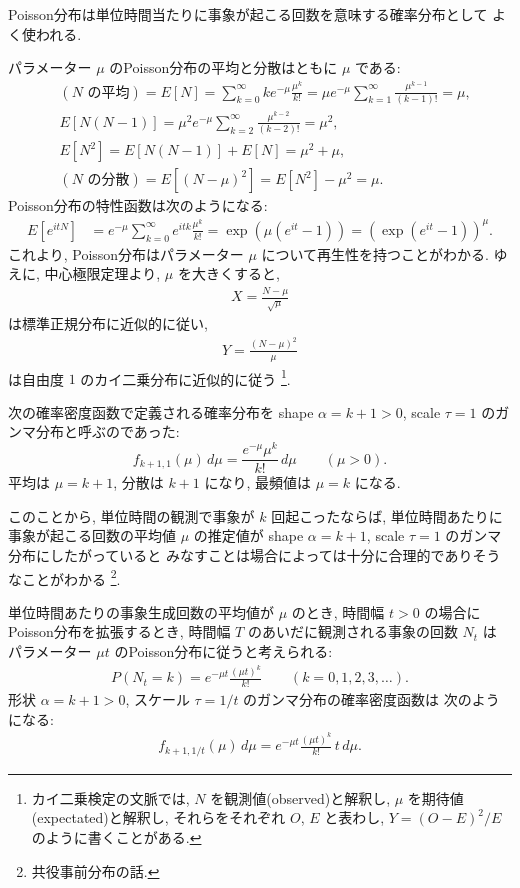 \documentclass[12pt,twoside]{jarticle}
\theoremstyle{jplain}
\theoremstyle{jplain}
\theoremstyle{jplain}
\numberwithin{theorem}{section}
\numberwithin{equation}{section}
\numberwithin{figure}{section}
\numberwithin{table}{section}
\begin{document}
Poisson分布は単位時間当たりに事象が起こる回数を意味する確率分布として
よく使われる.

パラメーター $\mu$ のPoisson分布の平均と分散はともに $\mu$ である:
\begin{align*}
&
(\text{$N$ の平均})
=E[N] 
= \sum_{k=0}^\infty k e^{-\mu}\frac{\mu^k}{k!}
= \mu e^{-\mu} \sum_{k=1}^\infty \frac{\mu^{k-1}}{(k-1)!}
= \mu,
\\ &
E[N(N-1)]
= \mu^2 e^{-\mu} \sum_{k=2}^\infty \frac{\mu^{k-2}}{(k-2)!}
= \mu^2,
\\ &
E[N^2] = E[N(N-1)]+E[N]=\mu^2+\mu,
\\ &
(\text{$N$ の分散})=E[(N-\mu)^2] = E[N^2]-\mu^2 = \mu.
\end{align*}
Poisson分布の特性函数は次のようになる:
\begin{align*}
E[e^{itN}] 
&= e^{-\mu} \sum_{k=0}^\infty e^{itk} \frac{\mu^k}{k!}
= \exp(\mu(e^{it}-1))
= \left(\exp(e^{it}-1)\right)^\mu.
\end{align*}
これより, Poisson分布はパラメーター $\mu$ について再生性を持つことがわかる.
ゆえに, 中心極限定理より, $\mu$ を大きくすると, 
\begin{align*}
X = \frac{N-\mu}{\sqrt{\mu}}
\end{align*}
は標準正規分布に近似的に従い, 
\begin{align*}
Y = \frac{(N-\mu)^2}{\mu}
\end{align*} 
は自由度 $1$ のカイ二乗分布に近似的に従う%
\footnote{%
カイ二乗検定の文脈では, 
$N$ を観測値(observed)と解釈し, 
$\mu$ を期待値(expectated)と解釈し, 
それらをそれぞれ $O$, $E$ と表わし, $Y=(O-E)^2/E$
のように書くことがある.}.

次の確率密度函数で定義される確率分布を
shape $\alpha=k+1>0$, scale $\tau=1$ のガンマ分布と呼ぶのであった:
\[
f_{k+1,1}(\mu)\,d\mu
=\frac{e^{-\mu}\mu^k}{k!}\,d\mu
\qquad (\mu>0).
\]
平均は $\mu=k+1$, 分散は $k+1$ になり,  
最頻値は $\mu=k$ になる.

このことから, 単位時間の観測で事象が $k$ 回起こったならば, 
単位時間あたりに事象が起こる回数の平均値 $\mu$ の推定値が
shape $\alpha=k+1$, scale $\tau=1$ のガンマ分布にしたがっていると
みなすことは場合によっては十分に合理的でありそうなことがわかる%
\footnote{共役事前分布の話.}.

単位時間あたりの事象生成回数の平均値が $\mu$ のとき,
時間幅 $t>0$ の場合にPoisson分布を拡張するとき, 
時間幅 $T$ のあいだに観測される事象の回数 $N_t$ は
パラメーター $\mu t$ のPoisson分布に従うと考えられる:
\begin{align*}
P(N_t=k) = e^{-\mu t}\frac{(\mu t)^k}{k!}
\qquad (k=0,1,2,3,\ldots).
\end{align*}
形状 $\alpha=k+1>0$, スケール $\tau=1/t$ のガンマ分布の確率密度函数は
次のようになる:
\begin{align*}
f_{k+1,1/t}(\mu)\,d\mu
=e^{-\mu t} \frac{(\mu t)^k}{k!}\,t\,d\mu.
\end{align*}
\end{document}
